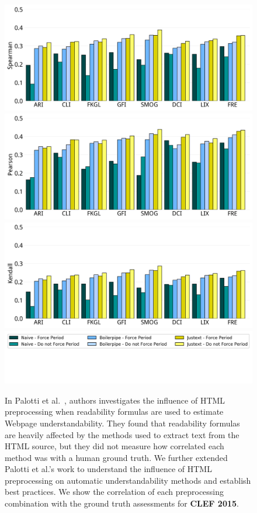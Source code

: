 \documentclass[10pt,a4paper]{article}
\begin{document}
\begin{figure}[h!]
	\centering
	\includegraphics[width=.6\textwidth]{appendix/bar_corr_spearman15_values}
	\includegraphics[width=.6\textwidth]{appendix/bar_corr_pearson15_values}
	\includegraphics[width=.6\textwidth]{appendix/bar_corr_kendalltau15_values}
	\includegraphics[width=.6\textwidth]{appendix/bar_raw_values}
    \caption{In Palotti et al.~\cite{palotti15}, authors investigates the influence of HTML preprocessing when readability formulas are used to estimate Webpage understandability. They found that readability formulas are heavily affected by the methods used to extract text from the HTML source, but they did not measure how correlated each method was with a human ground truth. We further extended Palotti et al.'s work to understand the influence of HTML preprocessing on automatic understandability methods and establish best practices. We show the correlation of each preprocessing combination with the ground truth assessments for \textbf{CLEF 2015}.}
	\label{fig:dist}
\end{figure}
\end{document}
